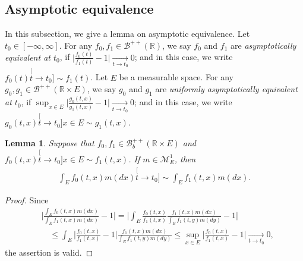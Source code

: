 \documentclass[12pt,a4paper]{amsart}
\newtheorem{lem}[thm]{Lemma}
\theoremstyle{definition}
\numberwithin{equation}{section}
\begin{document}
\subsection{Asymptotic equivalence} \label{sec: Asymptotic equivalence}
In this subsection, we give a lemma on asymptotic equivalence.	
Let $t_0 \in [-\infty,\infty]$.
For any $f_0, f_1\in \mathscr B^{++}({\mathbb R})$, we say $f_0$ and $f_1$ are \emph{asymptotically equivalent at $t_0$}, if $\big|\frac{f_0(t)}{f_1(t)} - 1\big| \xrightarrow[t\to t_0]{} 0$;
and in this case, we write $f_0(t) \stackrel[t\to t_0]{}{\sim} f_1(t)$.
Let $E$ be a measurable space.
For any $g_0, g_1\in \mathscr B^{++}({\mathbb R\times E})$, we say $g_0$ and $g_1$ are \emph{uniformly asymptotically equivalent at $t_0$}, if $\sup_{x\in E}\big|\frac{g_0(t,x)}{g_1(t,x)} - 1\big| \xrightarrow[t\to t_0]{} 0$; and in this case, we write $g_0(t,x)\stackrel[t\to t_0]{x\in E}{\sim}g_1(t,x)$.

\begin{lem} \label{lem: asymptotic equivalent of integration}
	Suppose that $f_0,f_1\in \mathscr B^{++}_b({\mathbb R \times E})$ and $f_0(t,x)\stackrel[t\to t_0]{x\in E}{\sim}f_1(t,x)$.
	If $m \in \mathcal M^1_E$, then
  \begin{align}
    \int_E f_0(t,x)m(dx)
    \stackrel[t\to t_0]{}{\sim}
    \int_E f_1(t,x)m(dx).
  \end{align}
\end{lem}
\begin{proof}
	Since
\begin{align}
	&\Big| \frac{	\int_E f_0(t,x)m(dx) }{ 	\int_E f_1(t,x)m(dx)  } - 1 \Big|
   = \Big| \int_E \frac{f_0(t,x)}{f_1(t,x)} \frac{f_1(t,x)m(dx)}{	\int_E f_1(t,y)m(dy)  } - 1\Big|
	\\&\quad \leq \int_E \Big|  \frac{f_0(t,x)}{f_1(t,x)} - 1 \Big| \frac{f_1(t,x)m(dx)}{	\int_E f_1(t,y)m(dy)  }
	\leq \sup_{x\in E} \Big|  \frac{f_0(t,x)}{f_1(t,x)} - 1 \Big|
	\xrightarrow[t\to t_0]{} 0,
\end{align}
the assertion is valid.
\end{proof}

\end{document}
